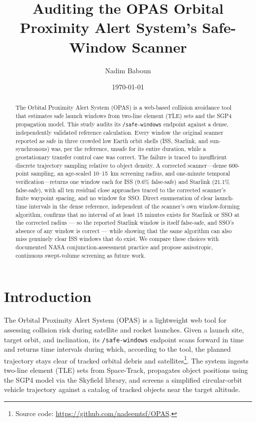\documentclass[11pt,a4paper]{article}
\title{Auditing the OPAS Orbital Proximity Alert System's Safe-Window Scanner}
\author[1]{Nadim Baboun}
\affil[1]{Al-Quds University}
\date{\today}
\begin{document}
\maketitle

\begin{abstract}
The Orbital Proximity Alert System (OPAS) is a web-based collision avoidance tool that estimates safe launch windows from two-line element (TLE) sets and the SGP4 propagation model. This study audits its \texttt{/safe-windows} endpoint against a dense, independently validated reference calculation. Every window the original scanner reported as safe in three crowded low Earth orbit shells (ISS, Starlink, and sun-synchronous) was, per the reference, unsafe for its entire duration, while a geostationary transfer control case was correct. The failure is traced to insufficient discrete trajectory sampling relative to object density. A corrected scanner---dense 600-point sampling, an age-scaled 10--15~km screening radius, and one-minute temporal verification---returns one window each for ISS (9.6\% false-safe) and Starlink (21.1\% false-safe), with all ten residual close approaches traced to the corrected scanner's finite waypoint spacing, and no window for SSO. Direct enumeration of clear launch-time intervals in the dense reference, independent of the scanner's own window-forming algorithm, confirms that no interval of at least 15 minutes exists for Starlink or SSO at the corrected radius --- so the reported Starlink window is itself false-safe, and SSO's absence of any window is correct --- while showing that the same algorithm can also miss genuinely clear ISS windows that do exist. We compare these choices with documented NASA conjunction-assessment practice and propose anisotropic, continuous swept-volume screening as future work.
\end{abstract}

\section{Introduction}

The Orbital Proximity Alert System (OPAS) is a lightweight web tool for assessing
collision risk during satellite and rocket launches. Given a launch site, target
orbit, and inclination, its \texttt{/safe-windows} endpoint scans forward in time
and returns time intervals during which, according to the tool, the planned
trajectory stays clear of tracked orbital debris and satellites\footnote{Source
code: \url{https://github.com/nadeemtsf/OPAS}.}. The system ingests two-line
element (TLE) sets from Space-Track, propagates object positions using the SGP4
model via the Skyfield library, and screens a simplified circular-orbit vehicle
trajectory against a catalog of tracked objects near the target altitude.
\end{document}
